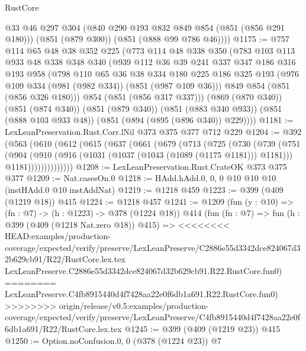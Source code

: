 \begin{lexlean}{RustCore}
\begin{coremodule}
{\begin{coremodule}
{{{{{        @33
        @46
        @297
        @304
        (@840 @290 @193 @832 @849 @854 (@851 (@856 @291 @180)))
        (@851 (@879 @300))
        (@851 (@888 @99 @786 @46))))
@1175 := @757
    @114
    @65
    @48
    @38
    @352
    @225
    (@773
      @114
      @48
      @338
      @350
      (@783
        @103
        @113
        @933
        @48
        @338
        @348
        @340
        (@939
          @112
          @36
          @39
          @241
          @337
          @347
          @186
          @316
          @193
          @958
          (@798
            @110
            @65
            @36
            @38
            @334
            @180
            @225
            @186
            @325
            @193
            (@976 @109 @334 (@981 (@982 @334)) (@851 (@987 @109 @36)))
            @849
            @854
            (@851 (@856 @326 @180)))
          @854
          (@851 (@856 @317 @337)))
        (@869 (@870 @340))
        (@851 (@874 @340))
        (@851 (@879 @340))
        (@851 (@883 @340 @933))
        (@851 (@888 @103 @933 @48))
        (@851 (@894 (@895 (@896 @340)) @229))))
@1181 := LexLeanPreservation.Rust.Corr.lNil @373 @375 @377 @712 @229
@1204 := @392
    (@563
      (@610
        (@612
          (@615
            (@637
              (@661
                (@679
                  (@713
                    (@725
                      (@730
                        (@739
                          (@751
                            (@904
                              (@910
                                (@916 (@1031 (@1037 (@1043 (@1089 (@1175 @1181))) @1181)))
                                @1181))))))))))))))
@1208 := LexLeanPreservation.Rust.CrateOK @373 @375 @377
@1209 := Nat.casesOn.{0}
@1218 := HAdd.hAdd.{0, 0, 0} @10 @10 @10 (instHAdd.{0} @10 instAddNat)
@1219 := @1218 @459
@1223 := @399 (@409 (@1219 @18)) @415
@1224 := @1218 @457
@1241 := @1209
    (fun (y : @10) => (fn : @7) -> (h : @1223) -> @378 (@1224 @18))
    @414
    (fun (fn : @7) =>
    fun (h : @399 (@409 (@1218 Nat.zero @18)) @415) =>
<<<<<<<< HEAD:examples/production-coverage/expected/verify/preserve/LexLeanPreserve/C2886e55d3342dce824067d32b629cb91/R22/RustCore.lex.tex
    LexLeanPreserve.C2886e55d3342dce824067d32b629cb91.R22.RustCore.fun0)
========
    LexLeanPreserve.C4fb8915440d4f7428aa22e0f6db1a691.R22.RustCore.fun0)
>>>>>>>> origin/release/v0.5:examples/production-coverage/expected/verify/preserve/LexLeanPreserve/C4fb8915440d4f7428aa22e0f6db1a691/R22/RustCore.lex.tex
@1245 := @399 (@409 (@1219 @23)) @415
@1250 := Option.noConfusion.{0, 0} (@378 (@1224 @23)) @7
}}}}}
\end{coremodule}}
\end{coremodule}
\end{lexlean}
